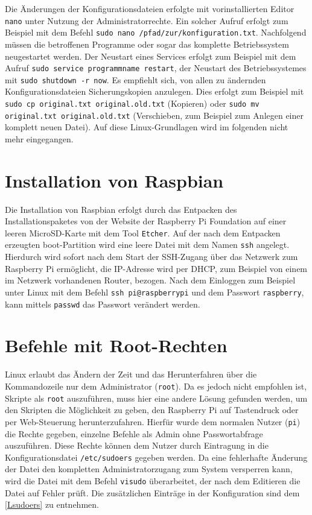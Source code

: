 \documentclass[a4paper,12pt,bibliography=totoc, listof=totoc,titlepage,pointlessnumbers]{scrreprt}
\newcommand{\code}[1]{\texttt{#1}}
\begin{document}
Die Änderungen der Konfigurationsdateien erfolgte mit vorinstallierten Editor \code{nano} unter Nutzung der Administratorrechte. Ein solcher Aufruf erfolgt zum Beispiel mit dem Befehl \code{sudo nano /pfad/zur/konfiguration.txt}. Nachfolgend müssen die betroffenen Programme oder sogar das komplette Betriebssystem neugestartet werden. Der Neustart eines Services erfolgt zum Beispiel mit dem Aufruf \code{sudo service programmname restart}, der Neustart des Betriebssystemes mit \code{sudo shutdown -r now}. Es empfiehlt sich, von allen zu ändernden Konfigurationsdateien Sicherungskopien anzulegen. Dies erfolgt zum Beispiel mit \code{sudo cp original.txt original.old.txt} (Kopieren) oder \code{sudo mv original.txt original.old.txt} (Verschieben, zum Beispiel zum Anlegen einer komplett neuen Datei). Auf diese Linux-Grundlagen wird im folgenden nicht mehr eingegangen.

\section{Installation von Raspbian}
Die Installation von Raspbian erfolgt durch das Entpacken des Installationspaketes von der Website der Raspberry Pi Foundation auf einer leeren MicroSD-Karte mit dem Tool \code{Etcher}. Auf der nach dem Entpacken erzeugten boot-Partition wird eine leere Datei mit dem Namen \code{ssh} angelegt. Hierdurch wird sofort nach dem Start der SSH-Zugang über das Netzwerk zum Raspberry Pi ermöglicht, die IP-Adresse wird per DHCP, zum Beispiel von einem im Netzwerk vorhandenen Router, bezogen. Nach dem Einloggen zum Beispiel unter Linux mit dem Befehl \code{ssh pi@raspberrypi} und dem Passwort \code{raspberry}, kann mittels \code{passwd} das Passwort verändert werden.


\section{Befehle mit Root-Rechten}
\label{s:root}
Linux erlaubt das Ändern der Zeit und das Herunterfahren über die Kommandozeile nur dem Administrator (\code{root}). Da es jedoch nicht empfohlen ist, Skripte als \code{root} auszuführen, muss hier eine andere Lösung gefunden werden, um den Skripten die Möglichkeit zu geben, den Raspberry Pi auf Tastendruck oder per Web-Steuerung herunterzufahren. Hierfür wurde dem normalen Nutzer (\code{pi}) die Rechte gegeben, einzelne Befehle  als Admin ohne Passwortabfrage auszuführen. Diese Rechte können dem Nutzer durch Eintragung in die Konfigurationsdatei \code{/etc/sudoers} gegeben werden. Da eine fehlerhafte Änderung der Datei den kompletten Administratorzugang zum System versperren kann, wird die Datei mit dem Befehl \code{visudo} überarbeitet, der nach dem Editieren die Datei auf Fehler prüft. Die zusätzlichen Einträge in der Konfiguration sind dem \autoref{Lsudoers} zu entnehmen.\citep{sudoers}
\end{document}
